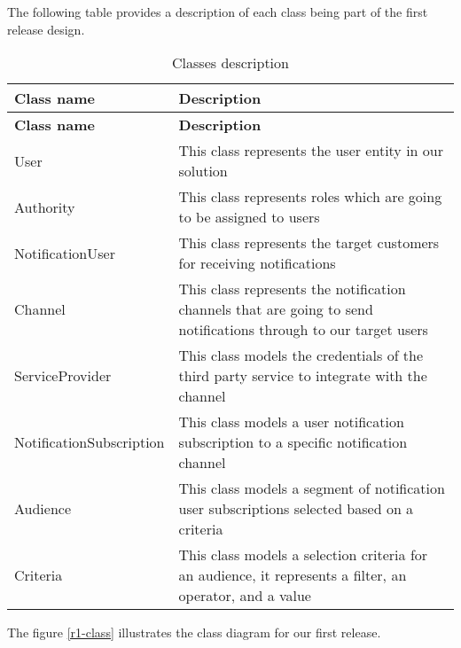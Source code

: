 \noindent The following table provides a description of each class being part of the first release design.

\begin{longtable}{ | m{} | m{} | }
    \caption{Classes description}                                                                                                               \\
    \hline
    \textbf{Class name}      & \textbf{Description}                                                                                             \\
    \hline
    \endfirsthead
    \hline
    \textbf{Class name}      & \textbf{Description}                                                                                             \\
    \hline
    \endhead
    \endfoot
    \hline
    \endlastfoot
    User                     & This class represents the user entity in our solution                                                            \\
    \hline
    Authority                & This class represents roles which are going to be assigned to users                                              \\
    \hline
    NotificationUser         & This class represents the target customers for receiving notifications                                           \\
    \hline
    Channel                  & This class represents the notification channels that are going to send notifications through to our target users \\
    \hline
    ServiceProvider          & This class models the credentials of the third party service to integrate with the channel                       \\
    \hline
    NotificationSubscription & This class models a user notification subscription to a specific notification channel                            \\
    \hline
    Audience                 & This class models a segment of notification user subscriptions selected based on a criteria                      \\
    \hline
    Criteria                 & This class models a selection criteria for an audience, it represents a filter, an operator, and a value         \\
\end{longtable}


\noindent The figure \ref{r1-class} illustrates the class diagram for our first release. \\


